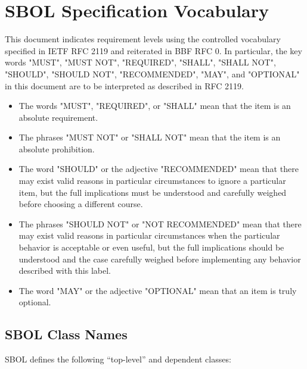 \section{SBOL Specification Vocabulary}

This document indicates requirement levels using the controlled vocabulary specified in IETF RFC 2119 and reiterated in BBF RFC 0.
In particular, the key words "MUST", "MUST NOT", "REQUIRED", "SHALL", "SHALL NOT", "SHOULD", "SHOULD NOT", "RECOMMENDED", "MAY", and "OPTIONAL" in this document are to be interpreted as described in RFC 2119.

\begin{itemize}
\item The words "MUST", "REQUIRED", or "SHALL" mean that the item is an absolute requirement.
\item The phrases "MUST NOT" or "SHALL NOT" mean that the item is an absolute prohibition.
\item The word "SHOULD" or the adjective "RECOMMENDED" mean that there may exist valid reasons in particular circumstances to ignore a particular item, but the full implications must be understood and carefully weighed before choosing a different course.
\item The phrases "SHOULD NOT" or "NOT RECOMMENDED" mean that there may exist valid reasons in particular circumstances when the particular behavior is acceptable or even useful, but the full implications should be understood and the case carefully weighed before implementing any behavior described with this label.
\item The word "MAY" or the adjective "OPTIONAL" mean that an item is truly optional.
\end{itemize}

\subsection{SBOL Class Names}

SBOL defines the following ``top-level'' and dependent classes:


